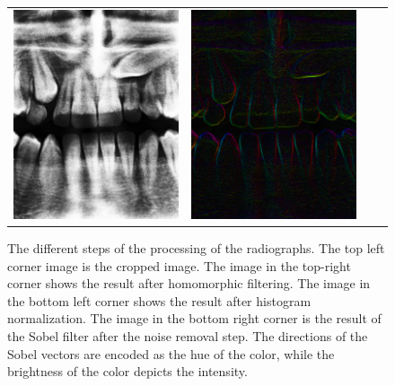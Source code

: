 \documentclass[a4paper,10pt]{article}
\begin{document}
\begin{figure}[!h]
\begin{tabular}{cccc}
 \includegraphics[width=80mm]{norm.png} & \includegraphics[width=80mm]{gradients.png} \\
 
\end{tabular}
 \caption{The different steps of the processing of the radiographs. The top left corner image is the cropped image. The image in the top-right corner shows the result after homomorphic filtering. The image in the bottom left corner shows the result after histogram normalization. The image in the bottom right corner is the result of the Sobel filter after the noise removal step. The directions of the Sobel vectors are encoded as the hue of the color, while the brightness of the color depicts the intensity. }
\end{figure}
\end{document}
